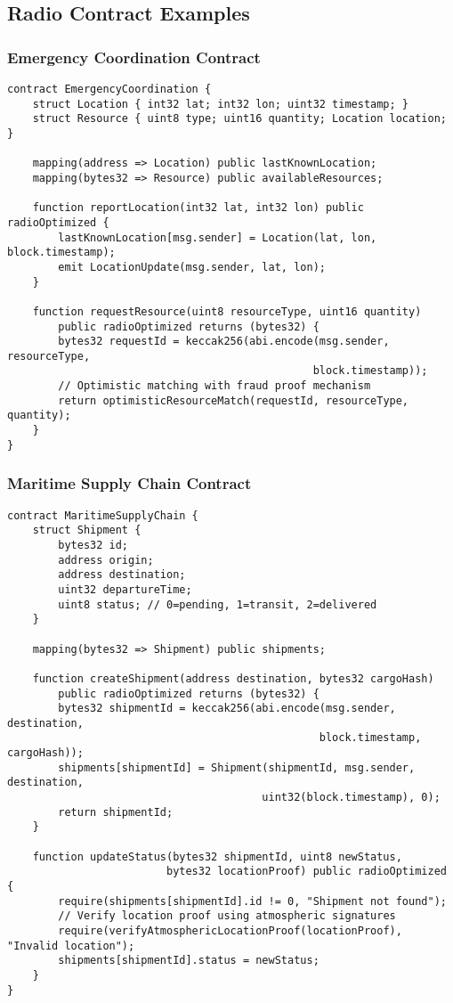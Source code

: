 \documentclass[11pt,a4paper]{article}
\begin{document}
\subsection{Radio Contract Examples}

\subsubsection{Emergency Coordination Contract}

\begin{verbatim}
contract EmergencyCoordination {
    struct Location { int32 lat; int32 lon; uint32 timestamp; }
    struct Resource { uint8 type; uint16 quantity; Location location; }
    
    mapping(address => Location) public lastKnownLocation;
    mapping(bytes32 => Resource) public availableResources;
    
    function reportLocation(int32 lat, int32 lon) public radioOptimized {
        lastKnownLocation[msg.sender] = Location(lat, lon, block.timestamp);
        emit LocationUpdate(msg.sender, lat, lon);
    }
    
    function requestResource(uint8 resourceType, uint16 quantity) 
        public radioOptimized returns (bytes32) {
        bytes32 requestId = keccak256(abi.encode(msg.sender, resourceType, 
                                                block.timestamp));
        // Optimistic matching with fraud proof mechanism
        return optimisticResourceMatch(requestId, resourceType, quantity);
    }
}
\end{verbatim}

\subsubsection{Maritime Supply Chain Contract}

\begin{verbatim}
contract MaritimeSupplyChain {
    struct Shipment { 
        bytes32 id; 
        address origin; 
        address destination; 
        uint32 departureTime;
        uint8 status; // 0=pending, 1=transit, 2=delivered
    }
    
    mapping(bytes32 => Shipment) public shipments;
    
    function createShipment(address destination, bytes32 cargoHash) 
        public radioOptimized returns (bytes32) {
        bytes32 shipmentId = keccak256(abi.encode(msg.sender, destination, 
                                                 block.timestamp, cargoHash));
        shipments[shipmentId] = Shipment(shipmentId, msg.sender, destination, 
                                        uint32(block.timestamp), 0);
        return shipmentId;
    }
    
    function updateStatus(bytes32 shipmentId, uint8 newStatus, 
                         bytes32 locationProof) public radioOptimized {
        require(shipments[shipmentId].id != 0, "Shipment not found");
        // Verify location proof using atmospheric signatures
        require(verifyAtmosphericLocationProof(locationProof), "Invalid location");
        shipments[shipmentId].status = newStatus;
    }
}
\end{verbatim}
\end{document}
